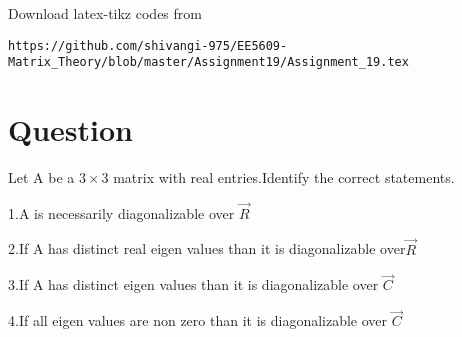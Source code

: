 \documentclass[journal,12pt]{IEEEtran}
\begin{document}
Download latex-tikz codes from 
%
\begin{lstlisting}
https://github.com/shivangi-975/EE5609-Matrix_Theory/blob/master/Assignment19/Assignment_19.tex
\end{lstlisting}
%
 
\section{\textbf{Question}}
Let A be a $3\times 3$  matrix  with real entries.Identify  the correct statements.

1.A  is necessarily diagonalizable over $\vec{R}$

2.If A has distinct real  eigen values than  it is diagonalizable over$\vec{R}$

3.If A has distinct eigen values than  it is diagonalizable over $\vec{C}$

4.If all eigen values are non zero than it is diagonalizable over $\vec{C}$
%
\end{document}
